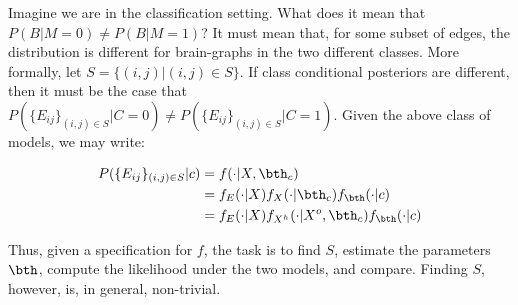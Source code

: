Imagine we are in the classification setting.  What does it mean that $P(B | M=0) \neq P(B | M=1)$?  It must mean that, for some subset of edges,  the distribution is different for brain-graphs in the two different classes.  More formally, let $S=\{(i,j) | (i,j) \in S\}$.  If class conditional posteriors are different, then it must be the case that $P(\{E_{ij}\}_{(i,j) \in S} | C=0) \neq P(\{E_{ij}\}_{(i,j) \in S} | C=1)$.  Given the above class of models, we may write:

\begin{align}
	P(\{E_{ij}\}_{(i,j) \in S} | c) &= f(\cdot | X, \bth_c) \nonumber \\
	&= f_E(\cdot | X) f_X(\cdot | \bth_c) f_{\bth}(\cdot | c) \nonumber \\
	&= f_E(\cdot | X) f_{X^h}(\cdot | X^o, \bth_c) f_{\bth}(\cdot | c)
\end{align}

Thus, given a specification for $f$, the task is to find $S$, estimate the parameters $\bth$, compute the likelihood under the two models, and compare.  Finding $S$, however, is, in general, non-trivial.






